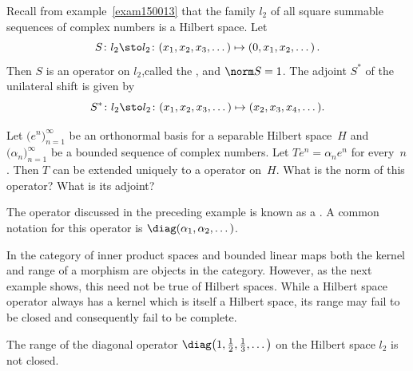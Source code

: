 \begin{exam}\label{C063526} Recall from example~\ref{exam150013} that the family $l_2$ of all
square summable sequences of complex numbers is a Hilbert space. Let
    \[ S\colon l_2 \sto l_2\colon (x_1,x_2,x_3,\dots) \mapsto (0,x_1,x_2,\dots)\,. \]
Then $S$ is an operator on $l_2$,called the
, and $\norm S = 1$.  The adjoint $S^*$ of the unilateral
shift
is given by
  \[ S^*\colon l_2 \sto l_2\colon (x_1,x_2,x_3,\dots) \mapsto (x_2,x_3,x_4,\dots). \]
\end{exam}

\begin{exam} Let $\bigl(e^n\bigr)_{n=1}^\infty$ be an orthonormal basis for a separable Hilbert space~$H$ and
$\bigl(\alpha_n\bigr)_{n=1}^\infty$ be a bounded sequence of complex numbers. Let $Te^n = \alpha_n e^n$ for every~$n$.
Then $T$ can be extended uniquely to a operator on~$H$.  What is the norm of this operator?  What is its adjoint?
\end{exam}

\begin{defn} The operator discussed in the preceding example is known as a
.   A common notation for this operator is
$\diag(\alpha_1,\alpha_2,\dots)$.
\end{defn}

In the category of inner product spaces and bounded linear maps both the kernel and range of a morphism are objects in the category.
However, as the next example shows, this need not be true of Hilbert spaces.  While a Hilbert space operator always has a kernel
which is itself a Hilbert space, its range may fail to be closed and consequently fail to be complete.

\begin{exam}\label{exam_ran_nonclosed} The range of the diagonal operator $\diag\bigl(1,\frac12,\frac13, \dots\bigr)$ on the
Hilbert space $l_2$ is not closed.
\end{exam}

